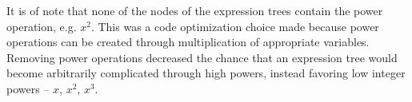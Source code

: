 It is of note that none of the nodes of the expression trees contain the power operation, e.g. $x^2$.  This was a code optimization choice made because power operations can be created through multiplication of appropriate variables.  Removing power operations decreased the chance that an expression tree would become arbitrarily complicated through high powers, instead favoring low integer powers -- $x$, $x^2$, $x^3$.

